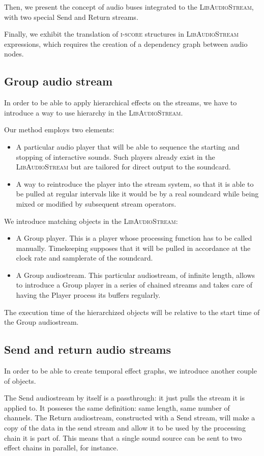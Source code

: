 \documentclass{article}
\newcommand*{\LibAudioStream}{\textsc{LibAudioStream}\xspace}
\newcommand*{\iscore}{\textsc{i-score}\xspace}
\begin{document}
Then, we present the concept of audio buses integrated to the \LibAudioStream,
with two special Send and Return streams.

Finally, we exhibit the translation of \iscore structures in \LibAudioStream expressions, which requires the creation of a dependency graph between audio nodes.
\subsection{Group audio stream}
In order to be able to apply hierarchical effects on the streams, 
we have to introduce a way to use hierarchy in the \LibAudioStream.

Our method employs two elements: 
\begin{itemize}
	\item A particular audio player that will be able to sequence the starting and stopping 
	of interactive sounds.
	Such players already exist in the \LibAudioStream but are tailored for direct output to
	the soundcard.
	\item A way to reintroduce the player into the stream system, so that it 
	is able to be pulled at regular intervals like it would be by a real soundcard while being mixed or modified by subsequent stream operators.
\end{itemize}

We introduce matching objects in the \LibAudioStream: 
\begin{itemize}
	\item A Group player. This is a player whose processing function has to be called manually. 
	Timekeeping supposes that it will be pulled in accordance at the clock rate
	and samplerate of the soundcard.
	\item A Group audiostream. This particular audiostream, of infinite length, 
	allows to introduce a Group player in a series of chained streams and takes care of having the Player process its buffers
    regularly.
\end{itemize}

The execution time of the hierarchized objects will be relative to the start time of the Group audiostream.

\subsection{Send and return audio streams}
In order to be able to create temporal effect graphs, we introduce another couple of objects.

The Send audiostream by itself is a passthrough: it just pulls the stream it is applied to.
It posseses the same definition: same length, same number of channels.
The Return audiostream, constructed with a Send stream, will make a copy of the data in 
the send stream and allow it to be used by the processing chain it is part of.
This means that a single sound source can be sent to two effect chains in parallel, for instance.
\end{document}

